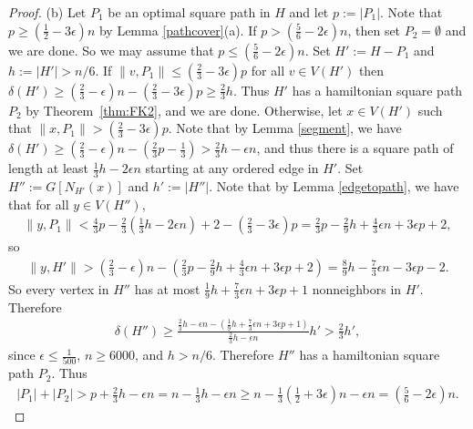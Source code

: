 \documentclass[oneside,12pt]{memoir}
\newcommand{\ep}{\epsilon}
\begin{document}
\begin{proof}
(b) Let $P_{1}$ be an optimal square path in $H$ and let $p:=|P_{1}|$. Note that $p\geq(\frac{1}{2}-3\ep)n$ by Lemma \ref{pathcover}(a).  If $p>(\frac{5}{6}-2\ep)n$, then set $P_2=\emptyset$ and we are done. So we may assume that $p\leq (\frac{5}{6}-2\ep)n$. Set $H':=H-P_{1}$ and $h:=|H'|>n/6$. If $\|v,P_{1}\|\leq(\frac{2}{3}-3\ep)p$ for all $v\in V(H')$
then $\delta(H')\geq(\frac{2}{3}-\ep)n-(\frac{2}{3}-3\ep) p\geq\frac{2}{3}h$. Thus  $H'$ has a hamiltonian square path $P_{2}$ by Theorem~\ref{thm:FK2}, and we are done. Otherwise, let $x\in V(H')$ such that $\|x,P_{1}\| >(\frac{2}{3}-3\ep)p$. Note that by Lemma \ref{segment}, we have $\delta(H')\geq(\frac{2}{3}-\ep)n -(\frac{2}{3}p -\frac{1}{3}) > \frac{2}{3}h-\ep n$, and thus there is a square path of length at least $\frac{1}{3}h-2\ep n$ starting at any ordered edge in $H'$. Set $H'':=G[N_{H'}(x)]$ and $h':=|H''|$. Note that by Lemma \ref{edgetopath}, we have that for all
$y\in V(H'')$, 
\begin{align*}
\|y,P_1\|<\frac{4}{3}p-\frac{2}{3}(\frac{1}{3}h-2\ep n)+2-(\frac{2}{3}-3\ep)p=\frac{2}{3}p-\frac{2}{9}h+\frac{4}{3}\ep n+3\ep p+2,\end{align*}
so \begin{align*}
\|y,H'\|>(\frac{2}{3}-\ep)n-(\frac{2}{3}p-\frac{2}{9}h+\frac{4}{3}\ep n+3\ep p+2)=\frac{8}{9}h-\frac{7}{3}\ep n-3\ep p-2.\end{align*}
So every vertex in $H''$ has at most $\frac{1}{9}h+\frac{7}{3}\ep n+3\ep p+1$ nonneighbors in $H'$. Therefore \begin{align*}
\delta(H'')\geq\frac{\frac{2}{3}h-\ep n-(\frac{1}{9}h+\frac{7}{3}\ep n+3\ep p+1)}{\frac{2}{3}h-\ep n}h' >\frac{2}{3}h',\end{align*}  %
 since $\ep\leq\frac{1}{500}$, $n\ge6000$, and $h>n/6$. Therefore $H''$ has a hamiltonian square path $P_{2}$. Thus \begin{align*}
|P_{1}|+|P_{2}| > p+\frac{2}{3}h-\ep n = n-\frac{1}{3}h-\ep n \geq n-\frac{1}{3}(\frac{1}{2}+3\ep)n-\ep n = (\frac{5}{6}-2\ep)n.\end{align*}

\end{proof}
\end{document}
